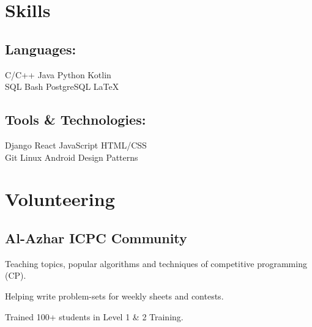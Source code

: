 \documentclass[]{deedy-resume-openfont}
\begin{document}
\begin{minipage}[t]{0.33\textwidth}

\section{Skills}
\subsection{Languages:}
C/C++ \textbullet{} Java \textbullet{} Python \textbullet{} Kotlin \\
SQL \textbullet{} Bash \textbullet{} PostgreSQL \textbullet{} \LaTeX\ \\
\hspace{}
\subsection{Tools \& Technologies:}
Django \textbullet{} React \textbullet{} JavaScript \textbullet{} HTML/CSS \\
Git \textbullet{} Linux \textbullet{} Android \textbullet{} Design Patterns \\
\sectionsep


\section{Volunteering}
\subsection{Al-Azhar ICPC Community}
\vspace{\topsep} %
\begin{tightemize}
    \item Teaching topics, popular algorithms and techniques of competitive programming (CP).\\
    \item Helping write problem-sets for weekly sheets and contests.
    \item Trained 100+ students in Level 1 \& 2 Training.
\end{tightemize}
\sectionsep



\end{minipage}
\end{document}
